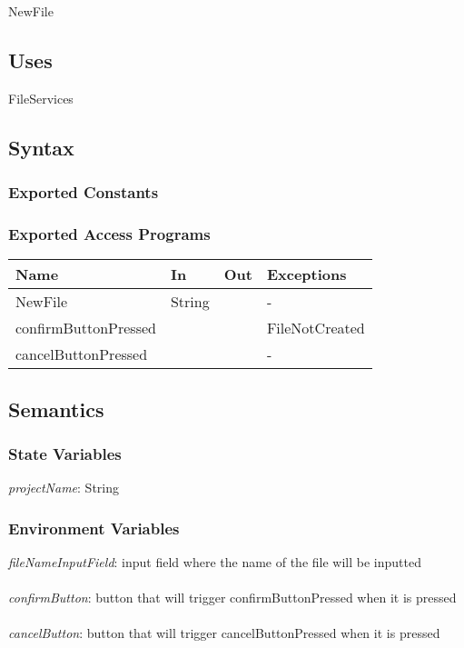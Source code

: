 \documentclass[12pt, titlepage]{article}
\begin{document}
	NewFile
	
	\subsection{Uses}
	FileServices
	
	\subsection{Syntax}
	
	\subsubsection{Exported Constants}
	
	\subsubsection{Exported Access Programs}
	
	\begin{center}
		\begin{tabular}{p{2cm} p{4cm} p{4cm} p{2cm}}
			\hline
			\textbf{Name} & \textbf{In} & \textbf{Out} & \textbf{Exceptions} \\
			\hline
			NewFile & String &  & - \\
			\hline
			confirmButtonPressed &  &  & FileNotCreated \\
			\hline
			cancelButtonPressed &  &  & - \\
			\hline
		\end{tabular}
	\end{center}
	
	\subsection{Semantics}
	
	\subsubsection{State Variables}
	\textit{projectName}: String
	
	
	\subsubsection{Environment Variables}
	
	\textit{fileNameInputField}: input field where the name of the file will be inputted \\\\
	\textit{confirmButton}: button that will trigger confirmButtonPressed when it is pressed \\\\ 
	\textit{cancelButton}: button that will trigger cancelButtonPressed when it is pressed \\\\ 
	
\end{document}
